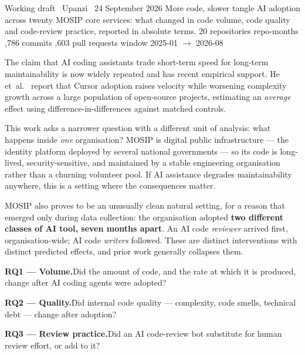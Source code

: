 \documentclass[11pt,a4paper]{article}
\begin{document}
\reportheader
  {Working draft \textperiodcentered\ Upanzi \textperiodcentered\ 24 September 2026}
  {More code, slower tangle}
  {AI adoption across twenty MOSIP core services: what changed in code volume,
   code quality and code-review practice, reported in absolute terms.}
  {20 repositories  repo-months ,786 commits ,603 pull requests \quad window 2025-01 $\rightarrow$ 2026-08}

\label{sec:intro}

The claim that AI coding assistants trade short-term speed for long-term
maintainability is now widely repeated and has recent empirical support. He
et~al.~\cite{he2026speed} report that Cursor adoption raises velocity while
worsening complexity growth across a large population of open-source projects,
estimating an \emph{average} effect using difference-in-differences against
matched controls.

This work asks a narrower question with a different unit of analysis: what
happens inside \emph{one} organisation? MOSIP is digital public infrastructure
--- the identity platform deployed by several national governments --- so its
code is long-lived, security-sensitive, and maintained by a stable engineering
organisation rather than a churning volunteer pool. If AI assistance degrades
maintainability anywhere, this is a setting where the consequences matter.

MOSIP also proves to be an unusually clean natural setting, for a reason that
emerged only during data collection: the organisation adopted \textbf{two
different classes of AI tool, seven months apart}. An AI code \emph{reviewer}
arrived first, organisation-wide; AI code \emph{writers} followed. These are
distinct interventions with distinct predicted effects, and prior work
generally collapses them.

\begin{rqbox}
\setlength{\parskip}{0.7em}
\textbf{RQ1 --- Volume.}\enspace Did the amount of code, and the rate at which
it is produced, change after AI coding agents were adopted?\par
\textbf{RQ2 --- Quality.}\enspace Did internal code quality --- complexity,
code smells, technical debt --- change after adoption?\par
\textbf{RQ3 --- Review practice.}\enspace Did an AI code-review bot substitute
for human review effort, or add to it?
\end{rqbox}
\end{document}
